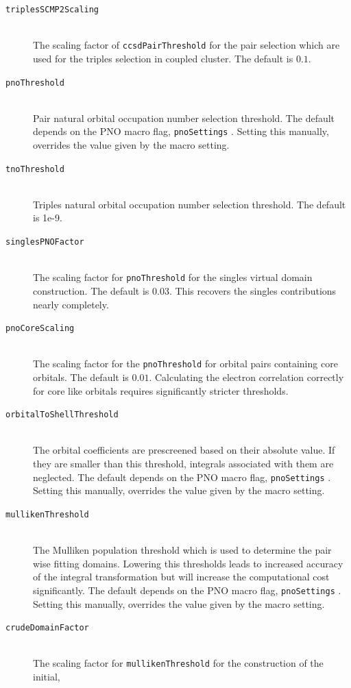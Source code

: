 \documentclass[bibliography=totocnumbered,a4paper,10pt,oneside]{scrbook}
\newcommand{\ttt}[1]{%
  \begingroup\setlength{\fboxsep}{1pt}%
  \colorbox{serenity-green!30}{\texttt{\hspace*{2pt}\vphantom{(g}#1\hspace*{2pt}}}%
  \endgroup
}
\begin{document}
\begin{description}
    \item [\texttt{triplesSCMP2Scaling}]\hfill \\
    The scaling factor of \ttt{ccsdPairThreshold} for the pair selection which are used for the triples
    selection in coupled cluster. The default is $0.1$.
    \item [\texttt{pnoThreshold}]\hfill \\
    Pair natural orbital occupation number selection threshold. The default depends on the PNO macro flag,
    \ttt{pnoSettings}. Setting this manually, overrides the value given by the macro setting.
    \item [\texttt{tnoThreshold}]\hfill \\
    Triples natural orbital occupation number selection threshold. The default is 1e-9.
    \item [\texttt{singlesPNOFactor}]\hfill \\
    The scaling factor for \ttt{pnoThreshold} for the singles virtual domain construction. The default
    is $0.03$. This recovers the singles contributions nearly completely.
    \item [\texttt{pnoCoreScaling}]\hfill \\
    The scaling factor for the \ttt{pnoThreshold} for orbital pairs containing core orbitals. The
    default is $0.01$. Calculating the electron correlation correctly for core like orbitals requires
    significantly stricter thresholds.
    \item [\texttt{orbitalToShellThreshold}]\hfill \\
    The orbital coefficients are prescreened based on their absolute value. If they are smaller than this
    threshold, integrals associated with them are neglected. The default depends on the PNO macro flag,
    \ttt{pnoSettings}. Setting this manually, overrides the value given by the macro setting.
    \item [\texttt{mullikenThreshold}]\hfill \\
    The Mulliken population threshold which is used to determine the pair wise fitting domains. Lowering this
    thresholds leads to increased accuracy of the integral transformation but will increase the computational
    cost significantly. The default depends on the PNO macro flag,
    \ttt{pnoSettings}. Setting this manually, overrides the value given by the macro setting.
    \item [\texttt{crudeDomainFactor}]\hfill \\
    The scaling factor for \ttt{mullikenThreshold} for the construction of the initial,

\end{description}
\end{document}
